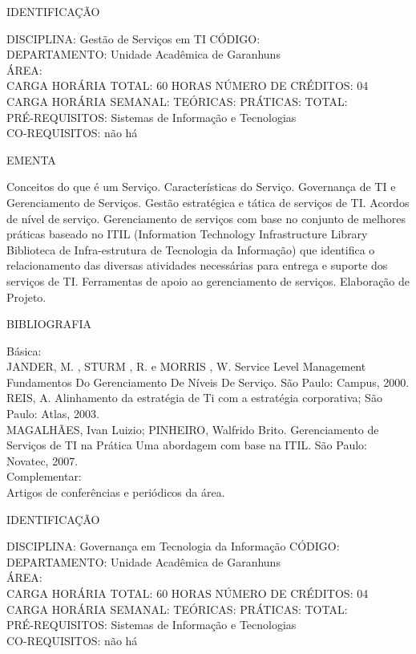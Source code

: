 \documentclass[
	12pt,				%
	openright,			%
  oneside,     %
	a4paper,			%
	chapter=TITLE,		%
	english,			%
	french,				%
	spanish,			%
	brazil				%
	]{abntex2}
\begin{document}
\begin{apendicesenv}
\newpage IDENTIFICAÇÃO

DISCIPLINA: Gestão de Serviços em TI CÓDIGO:\\ 
DEPARTAMENTO: Unidade Acadêmica de Garanhuns\\
ÁREA: \\
CARGA HORÁRIA TOTAL: 60 HORAS NÚMERO DE CRÉDITOS: 04\\
CARGA HORÁRIA SEMANAL: TEÓRICAS: PRÁTICAS: TOTAL: \\
PRÉ-REQUISITOS: Sistemas de Informação e Tecnologias\\
CO-REQUISITOS: não há

EMENTA 

Conceitos do que é um Serviço. Características do Serviço. Governança de
TI e Gerenciamento de Serviços. Gestão estratégica e tática de serviços
de TI. Acordos de nível de serviço. Gerenciamento de serviços com base
no conjunto de melhores práticas baseado no ITIL (Information
Technology Infrastructure Library Biblioteca de Infra-estrutura de
Tecnologia da Informação) que identifica o relacionamento das diversas
atividades necessárias para entrega e suporte dos serviços de TI.
Ferramentas de apoio ao gerenciamento de serviços. Elaboração de
Projeto.

BIBLIOGRAFIA 

Básica:\\
JANDER, M. , STURM , R. e MORRIS , W. Service Level Management 
Fundamentos Do Gerenciamento De Níveis De Serviço. São Paulo: Campus,
2000.\\
REIS, A. Alinhamento da estratégia de Ti com a estratégia corporativa;
São Paulo: Atlas, 2003.\\
MAGALHÃES, Ivan Luizio; PINHEIRO, Walfrido Brito. Gerenciamento de
Serviços de TI na Prática  Uma abordagem com base na ITIL. São
Paulo: Novatec, 2007.\\
Complementar:\\
Artigos de conferências e periódicos da área.

\newpage IDENTIFICAÇÃO

DISCIPLINA: Governança em Tecnologia da Informação CÓDIGO:\\ 
DEPARTAMENTO: Unidade Acadêmica de Garanhuns\\ 
ÁREA: \\
CARGA HORÁRIA TOTAL: 60 HORAS NÚMERO DE CRÉDITOS: 04\\
CARGA HORÁRIA SEMANAL: TEÓRICAS: PRÁTICAS: TOTAL: \\
PRÉ-REQUISITOS: Sistemas de Informação e Tecnologias\\
CO-REQUISITOS: não há


\end{apendicesenv}
\end{document}
